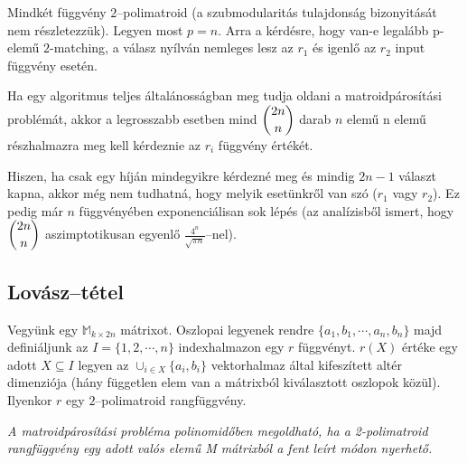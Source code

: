 Mindkét függvény $2$--polimatroid (a szubmodularitás tulajdonság bizonyitását
nem részletezzük). Legyen most $p=n$. Arra a kérdésre, hogy van-e legalább
p-elemű $2$-matching, a válasz nyílván nemleges lesz az $r_1$ és igenlő az $r_2$
input függvény esetén. 

Ha egy algoritmus teljes általánosságban meg tudja oldani a matroidpárosítási
problémát, akkor a legrosszabb esetben mind $\dbinom{2n}{n}$ darab $n$ elemű n
elemű részhalmazra meg kell kérdeznie az $r_i$ függvény értékét.

Hiszen, ha csak egy híján mindegyikre kérdezné meg és mindig $2n-1$ választ
kapna, akkor még nem tudhatná, hogy melyik esetünkről van szó ($r_1$ vagy
$r_2$). Ez pedig már $n$ függvényében exponenciálisan sok lépés (az analízisből
ismert, hogy $\dbinom{2n}{n}$ aszimptotikusan egyenlő $\frac{4^n}{\sqrt{\pi
n}}$--nel).

\subsection{Lovász--tétel}

Vegyünk egy $\mathbb{M}_{k \times 2n}$ mátrixot. Oszlopai legyenek rendre
$\{a_1, b_1, \cdots, a_n, b_n \}$ majd definiáljunk az $I=\{1,2,\cdots,n\}$
indexhalmazon egy $r$ függvényt. $r(X)$ értéke egy adott $X\subseteq I$ legyen
az $\cup_{i \in X}\{a_i, b_i\}$ vektorhalmaz által kifeszített altér dimenziója
(hány független elem van a mátrixból kiválasztott oszlopok közül).
Ilyenkor $r$ egy $2$--polimatroid rangfüggvény.

\vspace{0.4cm}
\emph{
A matroidpárosítási probléma polinomidőben megoldható, ha a 2-polimatroid
rangfüggvény egy adott valós elemű M mátrixból a fent leírt módon nyerhető.}